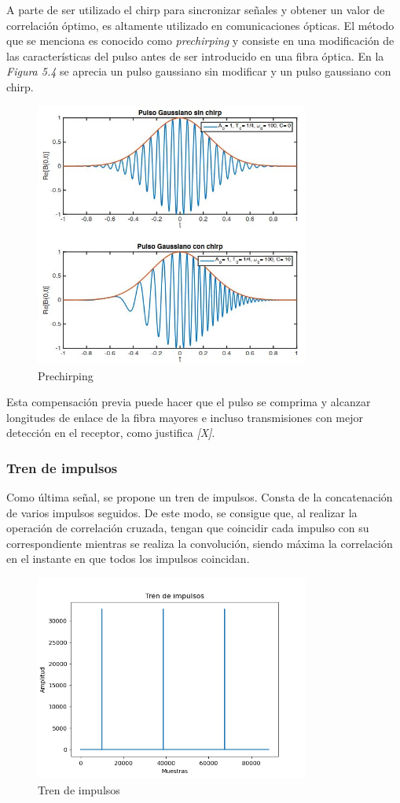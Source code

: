 \documentclass[a4paper,11pt]{book}
\begin{document}
A parte de ser utilizado el chirp para sincronizar señales y obtener un valor de correlación óptimo, es altamente utilizado en comunicaciones ópticas. El método que se menciona es conocido como \textit{prechirping} y consiste en una modificación de las características del pulso antes de ser introducido en una fibra óptica. En la \textit{Figura 5.4} se aprecia un pulso gaussiano sin modificar y un pulso gaussiano con chirp.

\begin{figure}[hbtp]
\centering
\includegraphics[width = 9cm]{FIGURAS/chirp.JPG}
\caption{Prechirping}
\end{figure}


Esta compensación previa puede hacer que el pulso se comprima y alcanzar longitudes de enlace de la fibra mayores e incluso  transmisiones con mejor detección en el receptor, como justifica \textit{[X]}.
\subsubsection{Tren de impulsos}
Como última señal, se propone un tren de impulsos. Consta de la concatenación de varios impulsos seguidos. De este modo, se consigue que, al realizar la operación de correlación cruzada, tengan que coincidir cada impulso con su correspondiente mientras se realiza la convolución, siendo máxima la correlación en el instante en que todos los impulsos coincidan.

\begin{figure}[hbtp]
\centering
\includegraphics[width = 9cm]{FIGURAS/tren_impulsos.png}
\caption{Tren de impulsos}
\end{figure}
\end{document}
